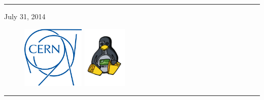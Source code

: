 \begin{titlepage}

\vspace*{3cm}


\noindent \rule{\textwidth}{.1cm}

\hfill July 31, 2014

\vspace*{3cm}

\begin{figure}[h]
  \includegraphics[height=3cm]{fig/cern-logo}
  \hfill
  \includegraphics[height=3cm]{fig/ohwr-logo}
\end{figure}

\vfill


\noindent \rule{\textwidth}{.05cm}

\end{titlepage}
